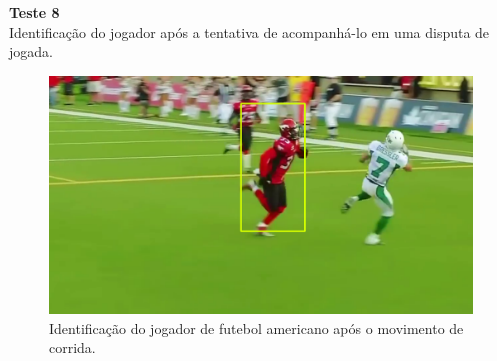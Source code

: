 \textbf{Teste 8}\\
Identificação do jogador após a tentativa de acompanhá-lo em uma disputa de jogada.

\begin{figure}
    \centering
    \caption{Identificação do jogador de futebol americano após o movimento de corrida.}
    \includegraphics[scale=0.2]{05-SLIDES_DESENVOLVIMENTO/Etapa_de_Testes/imagens_testes/jogador_dentro_de_campo_9.png}
\end{figure}